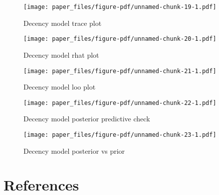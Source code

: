 \documentclass[
  letterpaper,
  DIV=11,
  numbers=noendperiod]{scrartcl}
\begin{document}
\begin{figure}

{\centering \texttt{[image: paper\_files/figure-pdf/unnamed-chunk-19-1.pdf]}

}

\caption{Decency model trace plot}

\end{figure}

\begin{figure}

{\centering \texttt{[image: paper\_files/figure-pdf/unnamed-chunk-20-1.pdf]}

}

\caption{Decency model rhat plot}

\end{figure}

\begin{figure}

{\centering \texttt{[image: paper\_files/figure-pdf/unnamed-chunk-21-1.pdf]}

}

\caption{Decency model loo plot}

\end{figure}

\begin{figure}

{\centering \texttt{[image: paper\_files/figure-pdf/unnamed-chunk-22-1.pdf]}

}

\caption{Decency model posterior predictive check}

\end{figure}

\begin{figure}

{\centering \texttt{[image: paper\_files/figure-pdf/unnamed-chunk-23-1.pdf]}

}

\caption{Decency model posterior vs prior}

\end{figure}

\newpage

\hypertarget{references}{%
\section*{References}\label{references}}
\end{document}
